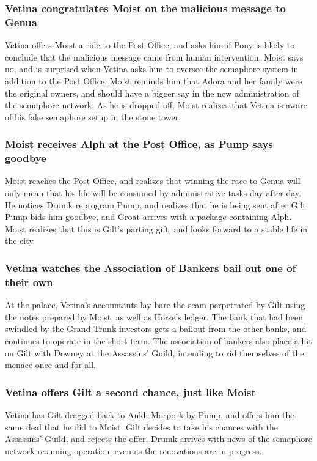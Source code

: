 \subsubsection{\Gls{Vetina} congratulates \Gls{Moist} on the malicious message to Genua}
\Gls{Vetina} offers \Gls{Moist} a ride to the Post Office, and asks him if \Gls{Pony} is likely to
conclude that the malicious message came from human intervention. \Gls{Moist} says no, and is
surprised when \Gls{Vetina} asks him to oversee the semaphore system in addition to the Post Office.
\Gls{Moist} reminds him that \Gls{Adora} and her family were the original owners, and should have a
bigger say in the new administration of the semaphore network. As he is dropped off, \Gls{Moist}
realizes that \Gls{Vetina} is aware of his fake semaphore setup in the stone tower.

\subsubsection{\Gls{Moist} receives \Gls{Alph} at the Post Office, as \Gls{Pump} says goodbye}
\Gls{Moist} reaches the Post Office, and realizes that winning the race to Genua will only mean that
his life will be consumed by administrative tasks day after day. He notices \Gls{Drumk} reprogram
\Gls{Pump}, and realizes that he is being sent after \Gls{Gilt}. \Gls{Pump} bids him goodbye, and
\Gls{Groat} arrives with a package containing \Gls{Alph}. \Gls{Moist} realizes that this is
\Gls{Gilt}'s parting gift, and looks forward to a stable life in the city.

\subsubsection{\Gls{Vetina} watches the Association of Bankers bail out one of their own}
At the palace, \Gls{Vetina}'s accountants lay bare the scam perpetrated by \Gls{Gilt} using the
notes prepared by \Gls{Moist}, as well as \Gls{Horse}'s ledger. The bank that had been swindled
by the Grand Trunk investors gets a bailout from the other banks, and continues to operate in the
short term. The association of bankers also place a hit on \Gls{Gilt} with \Gls{Downey} at the
Assassins' Guild, intending to rid themselves of the menace once and for all.

\subsubsection{\Gls{Vetina} offers \Gls{Gilt} a second chance, just like \Gls{Moist}}
\Gls{Vetina} has \Gls{Gilt} dragged back to Ankh-Morpork by \Gls{Pump}, and offers him the same
deal that he did to \Gls{Moist}. \Gls{Gilt} decides to take his chances with the Assassins' Guild,
and rejects the offer. \Gls{Drumk} arrives with news of the semaphore network resuming operation,
even as the renovations are in progress.
